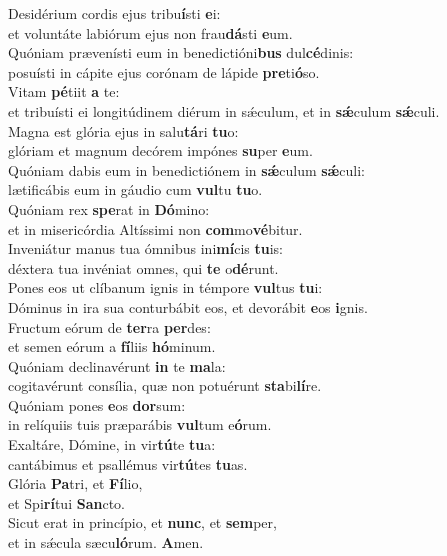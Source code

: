 \evenverse Desidérium cordis ejus tribu\textbf{í}sti \textbf{e}i:~\*\\
\evenverse et voluntáte labiórum ejus non frau\textbf{dá}sti \textbf{e}um.\\
\oddverse Quóniam prævenísti eum in benedictióni\textbf{bus} dul\textbf{cé}dinis:~\*\\
\oddverse posuísti in cápite ejus corónam de lápide \textbf{pre}ti\textbf{ó}so.\\
\evenverse Vitam \textbf{pé}tiit \textbf{a} te:~\*\\
\evenverse et tribuísti ei longitúdinem diérum in sǽculum, et in \textbf{sǽ}culum \textbf{sǽ}culi.\\
\oddverse Magna est glória ejus in salu\textbf{tá}ri \textbf{tu}o:~\*\\
\oddverse glóriam et magnum decórem impónes \textbf{su}per \textbf{e}um.\\
\evenverse Quóniam dabis eum in benedictiónem in \textbf{sǽ}culum \textbf{sǽ}culi:~\*\\
\evenverse lætificábis eum in gáudio cum \textbf{vul}tu \textbf{tu}o.\\
\oddverse Quóniam rex \textbf{spe}rat in \textbf{Dó}mino:~\*\\
\oddverse et in misericórdia Altíssimi non \textbf{com}mo\textbf{vé}bitur.\\
\evenverse Inveniátur manus tua ómnibus ini\textbf{mí}cis \textbf{tu}is:~\*\\
\evenverse déxtera tua invéniat omnes, qui \textbf{te} o\textbf{dé}runt.\\
\oddverse Pones eos ut clíbanum ignis in témpore \textbf{vul}tus \textbf{tu}i:~\*\\
\oddverse Dóminus in ira sua conturbábit eos, et devorábit \textbf{e}os \textbf{i}gnis.\\
\evenverse Fructum eórum de \textbf{ter}ra \textbf{per}des:~\*\\
\evenverse et semen eórum a \textbf{fí}liis \textbf{hó}minum.\\
\oddverse Quóniam declinavérunt \textbf{in} te \textbf{ma}la:~\*\\
\oddverse cogitavérunt consília, quæ non potuérunt \textbf{sta}bi\textbf{lí}re.\\
\evenverse Quóniam pones \textbf{e}os \textbf{dor}sum:~\*\\
\evenverse in relíquiis tuis præparábis \textbf{vul}tum e\textbf{ó}rum.\\
\oddverse Exaltáre, Dómine, in vir\textbf{tú}te \textbf{tu}a:~\*\\
\oddverse cantábimus et psallémus vir\textbf{tú}tes \textbf{tu}as.\\
\evenverse Glória \textbf{Pa}tri, et \textbf{Fí}lio,~\*\\
\evenverse et Spi\textbf{rí}tui \textbf{San}cto.\\
\oddverse Sicut erat in princípio, et \textbf{nunc}, et \textbf{sem}per,~\*\\
\oddverse et in sǽcula sæcu\textbf{ló}rum. \textbf{A}men.\\
